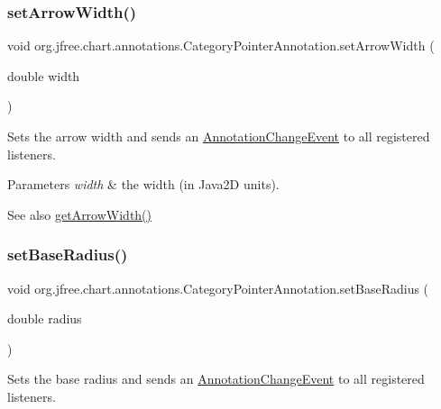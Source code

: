 \subsubsection{\texorpdfstring{set\+Arrow\+Width()}{setArrowWidth()}}
{\footnotesize\ttfamily void org.\+jfree.\+chart.\+annotations.\+Category\+Pointer\+Annotation.\+set\+Arrow\+Width (\begin{DoxyParamCaption}\item[{double}]{width }\end{DoxyParamCaption})}

Sets the arrow width and sends an \mbox{\hyperlink{}{Annotation\+Change\+Event}} to all registered listeners.


\begin{DoxyParams}{Parameters}
{\em width} & the width (in Java2D units).\\
\hline
\end{DoxyParams}
\begin{DoxySeeAlso}{See also}
\mbox{\hyperlink{classorg_1_1jfree_1_1chart_1_1annotations_1_1_category_pointer_annotation_a40de1109ca2d33db27e40be5a874f951}{get\+Arrow\+Width()}} 
\end{DoxySeeAlso}
\mbox{\label{classorg_1_1jfree_1_1chart_1_1annotations_1_1_category_pointer_annotation_ac28199dd33de04d60fd96c8e9e5a3773}} 
\subsubsection{\texorpdfstring{set\+Base\+Radius()}{setBaseRadius()}}
{\footnotesize\ttfamily void org.\+jfree.\+chart.\+annotations.\+Category\+Pointer\+Annotation.\+set\+Base\+Radius (\begin{DoxyParamCaption}\item[{double}]{radius }\end{DoxyParamCaption})}

Sets the base radius and sends an \mbox{\hyperlink{}{Annotation\+Change\+Event}} to all registered listeners.


